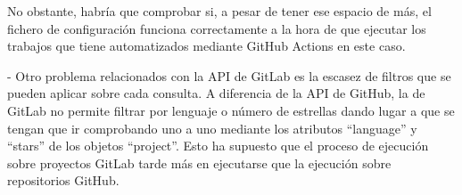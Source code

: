 No obstante, habría que comprobar si, a pesar de tener ese espacio de más, el fichero de configuración funciona correctamente a la hora de que ejecutar los trabajos que tiene automatizados mediante GitHub Actions en este caso.

- Otro problema relacionados con la API de GitLab es la escasez de filtros que se pueden aplicar sobre cada consulta. A diferencia de la API de GitHub, la de GitLab no permite filtrar por lenguaje o número de estrellas dando lugar a que se tengan que ir comprobando uno a uno mediante los atributos ``language'' y ``stars'' de los objetos ``project''. Esto ha supuesto que el proceso de ejecución sobre proyectos GitLab tarde más en ejecutarse que la ejecución sobre repositorios GitHub.